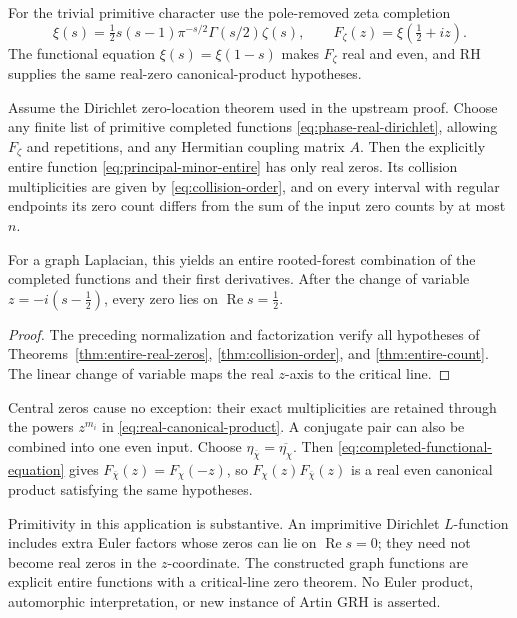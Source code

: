 For the trivial primitive character use the pole-removed zeta
completion
\[
 \xi(s)=\tfrac12s(s-1)\pi^{-s/2}\Gamma(s/2)\zeta(s),
 \qquad F_\zeta(z)=\xi\!\left(\tfrac12+iz\right).
\]
The functional equation $\xi(s)=\xi(1-s)$ makes $F_\zeta$ real and even,
and RH supplies the same real-zero canonical-product hypotheses.

\begin{corollary}
\label{cor:dirichlet-graphs}
Assume the Dirichlet zero-location theorem used in the upstream proof.
Choose any finite list of primitive completed functions
\eqref{eq:phase-real-dirichlet}, allowing $F_\zeta$ and repetitions,
and any Hermitian coupling matrix $A$.
Then the explicitly entire function
\eqref{eq:principal-minor-entire} has only real zeros.
Its collision multiplicities are given by \eqref{eq:collision-order},
and on every interval with regular endpoints its zero count differs
from the sum of the input zero counts by at most $n$.

For a graph Laplacian, this yields an entire rooted-forest combination
of the completed functions and their first derivatives.
After the change of variable $z=-i(s-\tfrac12)$, every zero lies on
$\operatorname{Re}s=\tfrac12$.
\end{corollary}
\begin{proof}
The preceding normalization and factorization verify all hypotheses
of Theorems~\ref{thm:entire-real-zeros},
\ref{thm:collision-order}, and \ref{thm:entire-count}.
The linear change of variable maps the real $z$-axis to the critical
line.
\end{proof}

Central zeros cause no exception: their exact multiplicities are
retained through the powers $z^{m_i}$ in
\eqref{eq:real-canonical-product}.
A conjugate pair can also be combined into one even input.
Choose $\eta_{\overline\chi}=\overline{\eta_\chi}$.
Then \eqref{eq:completed-functional-equation} gives
$F_{\overline\chi}(z)=F_\chi(-z)$, so
$F_\chi(z)F_{\overline\chi}(z)$ is a real even canonical product
satisfying the same hypotheses.

Primitivity in this application is substantive.  An imprimitive
Dirichlet $L$-function includes extra Euler factors whose zeros can lie
on $\operatorname{Re}s=0$; they need not become real zeros in the
$z$-coordinate.  The constructed graph functions are explicit entire
functions with a critical-line zero theorem.  No Euler product,
automorphic interpretation, or new instance of Artin GRH is asserted.

